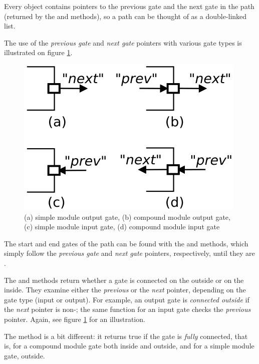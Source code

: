 Every  object contains pointers to the previous gate
and the next gate in the path (returned by the 
and  methods), so a path can be thought of as
a double-linked list.

The use of the \textit{previous gate} and \textit{next gate} pointers
with various gate types is illustrated on figure
\ref{fig:ch-simple-modules:gates}.

\begin{figure}[htbp]
\begin{center}
\includegraphics{figures/simple-gates}
\caption{(a) simple module output gate, (b) compound module output gate,
         (c) simple module input gate, (d) compound module input gate}
\label{fig:ch-simple-modules:gates}
\end{center}
\end{figure}

The start and end gates of the path can be found with the 
and  methods, which simply follow the \textit{previous gate} and
\textit{next gate} pointers, respectively, until they are .

The  and  methods
return whether a gate is connected on the outside or on the inside. They
examine either the \textit{previous} or the \textit{next} pointer, depending on the
gate type (input or output). For example, an output gate is \textit{connected outside}
if the \textit{next} pointer is non-; the same function for an input gate
checks the \textit{previous} pointer. Again, see figure \ref{fig:ch-simple-modules:gates}
for an illustration.

The  method is a bit different: it returns true if the gate
is \textit{fully} connected, that is, for a compound module gate
both inside and outside, and for a simple module gate, outside.

